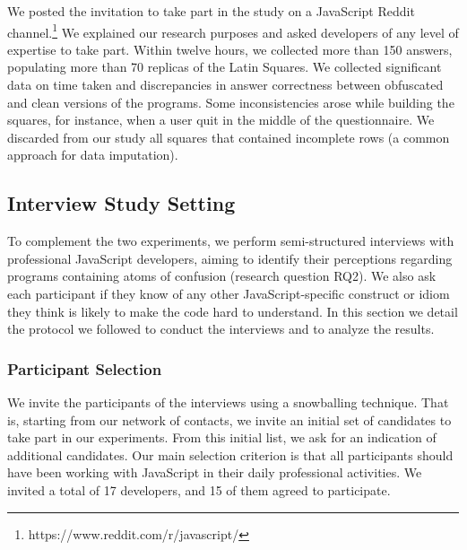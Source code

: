 We posted the invitation to take part in the study on a JavaScript Reddit channel.\footnote{https://www.reddit.com/r/javascript/} We explained our research purposes and asked developers of any level of expertise to take part. Within twelve hours, we collected more than 150 answers, populating more than 70 replicas of the Latin Squares. We collected significant data on time taken and discrepancies in answer correctness between obfuscated and clean versions of the programs. Some inconsistencies arose while building the squares, for instance, when a user quit in the middle of the questionnaire. We discarded from our study all squares that contained incomplete rows (a common approach for data imputation).

 
\subsection{Interview Study Setting}

To complement the two experiments, we perform semi-structured interviews with professional JavaScript developers, aiming to identify their perceptions regarding programs containing atoms of confusion (research question RQ2). We also ask each participant if they know of any other JavaScript-specific construct or idiom they think is likely to make the code hard to understand. %
In this section we detail the protocol we followed to conduct the interviews and to analyze the results.


\subsubsection*{Participant Selection} We invite the participants of the interviews using a snowballing technique. That is, starting from our network of contacts, we invite an initial set of candidates to take part in our experiments. From this initial list, we ask for an indication of additional candidates. Our main selection criterion is that all participants should have been working with JavaScript in their daily professional activities. We invited a total of 17 developers, and 15 of them agreed to participate.   


